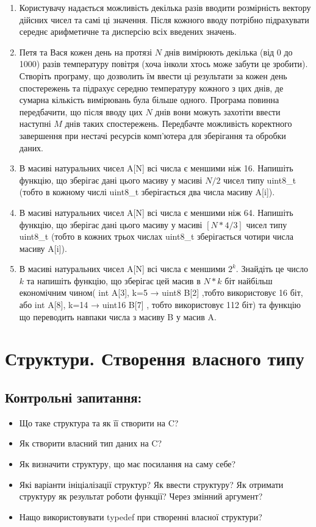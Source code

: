 \documentclass[a5paper,titlepage,openany,twoside,
]
{book_unv}%
\begin{document}
\begin{enumerate}
\begin{enumerate}
\def\labelenumi{\arabic{enumi})}
\setcounter{enumi}{8}
\item
  Користувачу надається можливість декілька разів вводити розмірність
  вектору дійсних чисел та самі ці значення. Після кожного вводу
  потрібно підрахувати середнє арифметичне та дисперсію всіх введених
  значень.
\item
  Петя та Вася кожен день на протязі $N$ днів вимірюють
  декілька (від 0 до 1000) разів температуру повітря (хоча інколи хтось
  може забути це зробити). Створіть програму, що дозволить їм ввести ці
  результати за кожен день спостережень та підрахує середню температуру
  кожного з цих днів, де сумарна кількість вимірювань була більше одного.
  Програма повинна передбачити, що після вводу цих $N$ днів вони можуть
  захотіти ввести наступні $M$ днів таких спостережень. Передбачте
  можливість коректного завершення при нестачі ресурсів комп'ютера для
  зберігання та обробки даних.
\item
 В масиві натуральних чисел A{[}N{]} всі числа є меншими ніж 16. Напишіть
  функцію, що зберігає дані цього масиву у масиві $N/2$ чисел типу
  uint8\_t (тобто в кожному числі uint8\_t зберігається два числа масиву
  A{[}i{]}).
\item
  В масиві натуральних чисел A{[}N{]} всі числа є меншими ніж 64. Напишіть
  функцію, що зберігає дані цього масиву у масиві $[N*4/3]$ чисел типу
  uint8\_t (тобто в кожних трьох числах uint8\_t зберігається чотири
  числа масиву A{[}i{]}).
\item
  В масиві натуральних чисел A{[}N{]} всі числа є меншими \(2^{k}\).
  Знайдіть це число $k$ та напишіть функцію, що зберігає цей масив в $N*k$
  біт найбільш економічним чином( int A{[}3{]}, k=5 → uint8 B{[}2{]}
  ,тобто використовує 16 біт, або int A{[}8{]}, k=14 → uint16 B{[}7{]} ,
  тобто використовує 112 біт) та функцію що переводить навпаки числа з
  масиву B у масив A.
\end{enumerate}



\chapter{Структури. Створення власного типу}
%

\section{Контрольні запитання:}
\begin{itemize}
\item Що таке структура та як її створити на C?
\item Як створити власний тип даних на C?
\item Як визначити структуру, що має посилання на саму себе?
\item Які варіанти ініціалізації структур? Як ввести структуру? Як отримати
структуру як результат роботи функції? Через змінний аргумент?
\item Нащо використовувати typedef при створенні власної структури?
\end{itemize}


\end{enumerate}
\end{document}
